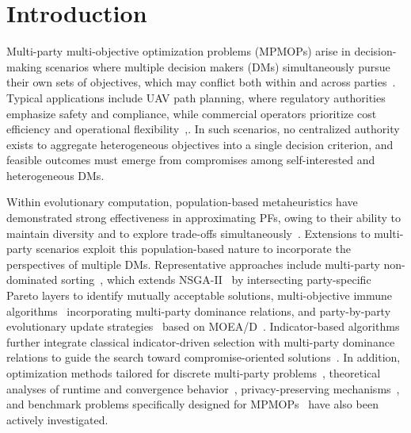\documentclass[journal]{IEEEtran}
\begin{document}
\section{Introduction}
\label{sec: introduction}
Multi-party multi-objective optimization problems (MPMOPs) arise in decision-making scenarios where multiple decision makers (DMs) simultaneously pursue their own sets of objectives, which may conflict both within and across parties~\cite{liu2020evolutionary}. Typical applications include UAV path planning, where regulatory authorities emphasize safety and compliance, while commercial operators prioritize cost efficiency and operational flexibility~\cite{chen2025novel},\cite{chen2024evolutionary}. In such scenarios, no centralized authority exists to aggregate heterogeneous objectives into a single decision criterion, and feasible outcomes must emerge from compromises among self-interested and heterogeneous DMs. 

Within evolutionary computation, population-based metaheuristics have demonstrated strong effectiveness in approximating PFs, owing to their ability to maintain diversity and to explore trade-offs simultaneously~\cite{HuangLi2024_Survey, xue2025multiple, Wang2024_Surrogate}. Extensions to multi-party scenarios exploit this population-based nature to incorporate the perspectives of multiple DMs. Representative approaches include multi-party non-dominated sorting~\cite{she2021new,she2023multiparty}, which extends NSGA-II~\cite{deb2002fast} by intersecting party-specific Pareto layers to identify mutually acceptable solutions, multi-objective immune algorithms~\cite{chen2024evolutionary} incorporating multi-party dominance relations, and party-by-party evolutionary update strategies~\cite{chang2022multiparty,chang2023biparty} based on MOEA/D~\cite{zhang2007moea}. Indicator-based algorithms further integrate classical indicator-driven selection with multi-party dominance relations to guide the search toward compromise-oriented solutions~\cite{song2024indicator}. In addition, optimization methods tailored for discrete multi-party problems~\cite{zhang2025multi}, theoretical analyses of runtime and convergence behavior~\cite{sun2025runtime}, privacy-preserving mechanisms~\cite{she2023privacy}, and benchmark problems specifically designed for MPMOPs~\cite{song2022multiobjective,luo2024benchmark} have also been actively investigated.
\end{document}
